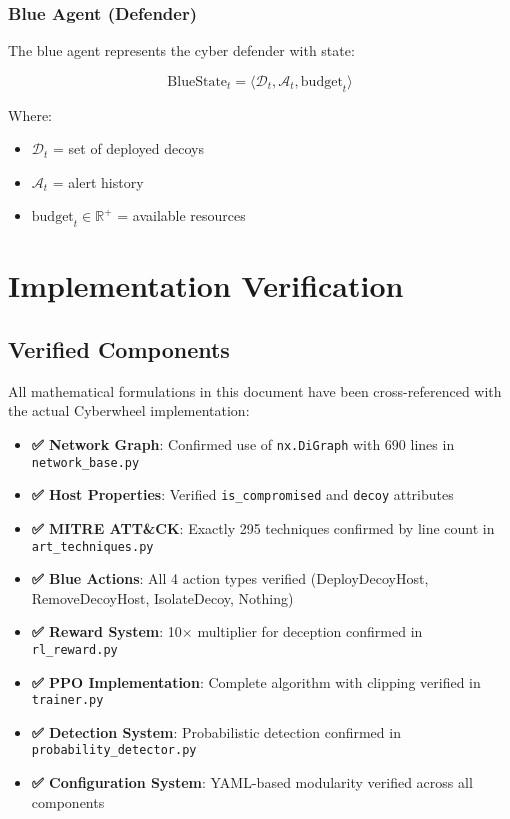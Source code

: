 \documentclass[12pt,a4paper]{article}
\begin{document}
\subsubsection{Blue Agent (Defender)}
The blue agent represents the cyber defender with state:

\begin{equation}
\text{BlueState}_t = \langle \mathcal{D}_t, \mathcal{A}_t, \text{budget}_t \rangle
\end{equation}

Where:
\begin{itemize}
    \item $\mathcal{D}_t$ = set of deployed decoys
    \item $\mathcal{A}_t$ = alert history
    \item $\text{budget}_t \in \mathbb{R}^+$ = available resources
\end{itemize}

\section{Implementation Verification}

\subsection{Verified Components}
All mathematical formulations in this document have been cross-referenced with the actual Cyberwheel implementation:

\begin{itemize}
    \item \textbf{✅ Network Graph}: Confirmed use of \texttt{nx.DiGraph} with 690 lines in \texttt{network\_base.py}
    \item \textbf{✅ Host Properties}: Verified \texttt{is\_compromised} and \texttt{decoy} attributes
    \item \textbf{✅ MITRE ATT\&CK}: Exactly 295 techniques confirmed by line count in \texttt{art\_techniques.py}
    \item \textbf{✅ Blue Actions}: All 4 action types verified (DeployDecoyHost, RemoveDecoyHost, IsolateDecoy, Nothing)
    \item \textbf{✅ Reward System}: 10× multiplier for deception confirmed in \texttt{rl\_reward.py}
    \item \textbf{✅ PPO Implementation}: Complete algorithm with clipping verified in \texttt{trainer.py}
    \item \textbf{✅ Detection System}: Probabilistic detection confirmed in \texttt{probability\_detector.py}
    \item \textbf{✅ Configuration System}: YAML-based modularity verified across all components
\end{itemize}
\end{document}
